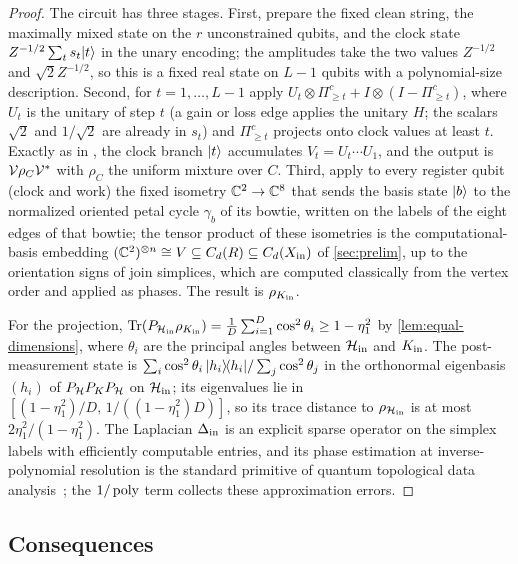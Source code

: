 \begin{proof}
The circuit has three stages.  First, prepare the fixed clean string, the
maximally mixed state on the \(r\) unconstrained qubits, and the clock state
\(Z^{-1/2}\sum_ts_t\lvert t\rangle\) in the unary encoding; the amplitudes take the
two values \(Z^{-1/2}\) and \(\sqrt2Z^{-1/2}\), so this is a fixed real state
on \(L-1\) qubits with a polynomial-size description.  Second, for
\(t=1,\dots,L-1\) apply \(U_t\otimes\Pi^c_{\ge t}+I\otimes(I-\Pi^c_{\ge t})\),
where \(U_t\) is the unitary of step \(t\) (a gain or loss edge applies the
unitary \(H\); the scalars \(\sqrt2\) and \(1/\sqrt2\) are already in
\(s_t\)) and \(\Pi^c_{\ge t}\) projects onto clock values at least \(t\).
Exactly as in \cite[Lemma~8]{lowe2026normalized}, the clock branch \(\lvert t\rangle\)
accumulates \(V_t=U_t\cdots U_1\), and the output is
\(\mathcal{V}\rho_C\mathcal{V}^*\) with \(\rho_C\) the uniform mixture over \(C\).  Third,
apply to every register qubit (clock and work) the fixed isometry
\(\mathbb{C}^2\to\mathbb{C}^{8}\) that sends the basis state \(\lvert b\rangle\) to the normalized
oriented petal cycle \(\gamma_b\) of its bowtie, written on the labels of the
eight edges of that bowtie; the tensor product of these isometries is the
computational-basis embedding \((\mathbb{C}^2)^{\otimes n}\cong V\subseteq C_d(R)\subseteq C_d(X_{\mathrm{in}})\)
of \cref{sec:prelim}, up to the orientation signs of join simplices, which
are computed classically from the vertex order and applied as phases.  The
result is \(\rho_{K_{\rm in}}\).

For the projection, \(\mathrm{Tr}(P_{\mathcal{H}_{\rm in}}\rho_{K_{\rm in}})
=\frac1D\sum_{i=1}^D\cos^2\theta_i\ge1-\eta_1^2\) by
\cref{lem:equal-dimensions}, where \(\theta_i\) are the principal angles
between \(\mathcal{H}_{\rm in}\) and \(K_{\rm in}\).  The post-measurement state is
\(\sum_i\cos^2\theta_i\,\lvert h_i\rangle\!\langle h_i\rvert/\sum_j\cos^2\theta_j\) in the
orthonormal eigenbasis \((h_i)\) of \(P_{\mathcal{H}}P_KP_{\mathcal{H}}\) on \(\mathcal{H}_{\rm in}\);
its eigenvalues lie in \([(1-\eta_1^2)/D,\,1/((1-\eta_1^2)D)]\), so its trace
distance to \(\rho_{\mathcal{H}_{\rm in}}\) is at most \(2\eta_1^2/(1-\eta_1^2)\).
The Laplacian \(\Delta_{\rm in}\) is an explicit sparse operator on the
simplex labels with efficiently computable entries, and its phase estimation
at inverse-polynomial resolution is the standard primitive of quantum
topological data analysis~\cite{lloyd2016quantum,hayakawa2022quantum,mcardle2026streamlined};
the \(1/\operatorname{poly}\) term collects these approximation errors.
\end{proof}

\subsection{Consequences}

